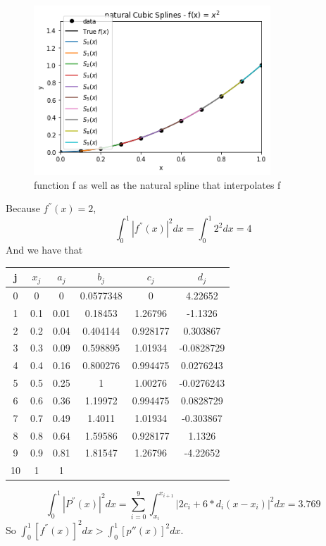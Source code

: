 \documentclass{article}
\begin{document}
\begin{figure}[H]            \centering\includegraphics[width=3.5in,height=2.5in]{problem3.png}
	\caption{function f as well as the natural spline that interpolates f}
	\label{fig:graph}
\end{figure}
Because $f^{''}(x) = 2$,
$$ \int_0^1 |f^{''}(x)|^2 dx = \int_0^1 2^2 dx = 4 $$
And we have that\\	
	\begin{tabular}{cccccc}
		\hline
	    j &$x_j$&$a_j$&$b_j$&$c_j$&$d_j$\\
		\hline
	    0& 0  & 0   & 0.0577348& 0      & 4.22652\\
	    
	    1& 0.1& 0.01& 0.18453  & 1.26796&-1.1326\\
	    
	    2& 0.2& 0.04& 0.404144 & 0.928177&0.303867\\
	    
	  3& 0.3&0.09&   0.598895& 1.01934  &-0.0828729\\
	  
	    4& 0.4&0.16 &  0.800276& 0.994475&0.0276243\\
	    
	    5& 0.5&0.25&   1       & 1.00276&-0.0276243\\
	  
	    6& 0.6& 0.36&  1.19972 & 0.994475&0.0828729\\
	    
	    7& 0.7&0.49&   1.4011  &1.01934&-0.303867\\
	    
	    8& 0.8& 0.64&  1.59586 &0.928177&1.1326\\
	    
	    9& 0.9& 0.81&  1.81547 &1.26796&-4.22652\\
	    
        10& 1&  1   &          &        &  \\
		\hline
	\end{tabular}

$$ \int_0^1 |P^{''}(x)|^2 dx = \sum_{i = 0}^{9}\int_{x_i}^{x_{i+1}} |2c_i + 6*d_i(x-x_i)|^2 dx = 3.769$$
So
$ \int_0^1 [f^{''}(x)]^2 dx > \int_0^1 [p{''}(x)]^2 dx $.
\end{document}
